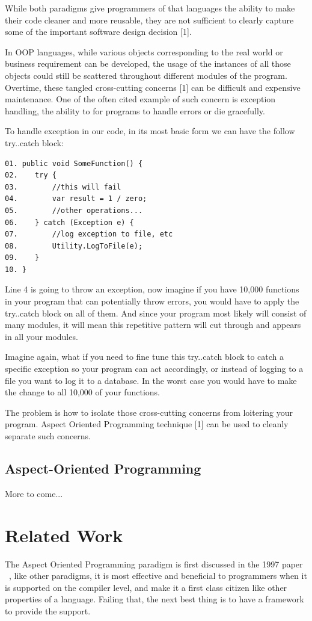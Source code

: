 While both paradigms give programmers of that languages the ability to make their code cleaner and more reusable, they are not sufficient to clearly capture some of the important software design decision [1].

In OOP languages, while various objects corresponding to the real world or business requirement can be developed, the usage of the instances of all those objects could still be scattered throughout different modules of the program. Overtime, these tangled cross-cutting concerns [1] can be difficult and expensive maintenance. One of the often cited example of such concern is exception handling, the ability to for programs to handle errors or die gracefully.

To handle exception in our code, in its most basic form we can have the follow try..catch block:
\begin{verbatim}
01. public void SomeFunction() {
02.    try {
03.        //this will fail
04.        var result = 1 / zero;
05.        //other operations...
06.    } catch (Exception e) {
07.        //log exception to file, etc
08.        Utility.LogToFile(e);
09.    }
10. }
\end{verbatim}

Line 4 is going to throw an exception, now imagine if you have 10,000 functions in your program that can potentially throw errors, you would have to apply the try..catch block on all of them. And since your program most likely will consist of many modules, it will mean this repetitive pattern will cut through and appears in all your modules.

Imagine again, what if you need to fine tune this try..catch block to catch a specific exception so your program can act accordingly, or instead of logging to a file you want to log it to a database. In the worst case you would have to make the change to all 10,000 of your functions.

The problem is how to isolate those cross-cutting concerns from loitering your program. Aspect Oriented Programming technique [1] can be used to cleanly separate such concerns.

\subsection{Aspect-Oriented Programming}
More to come...

\section{Related Work}
The Aspect Oriented Programming paradigm is first discussed in the 1997 paper ~\cite{aop}, like other paradigms, it is most effective and beneficial to programmers when it is supported on the compiler level, and make it a first class citizen like other properties of a language. Failing that, the next best thing is to have a framework to provide the support.

